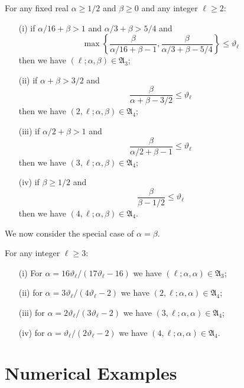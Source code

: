 \documentclass[12pt]{amsart}
\begin{document}
\begin{theorem}\label{thm:pPkPl}
For any fixed real  $\alpha \ge 1/2$ and $\beta \ge 0$  and  any integer $\ell\ge 2$:
\begin{itemize}
\item[(i)]
if $\alpha/16+  \beta > 1$ and $\alpha/3+ \beta > 5/4$
and 
$$
  \max\left\{ 
\frac{\beta}{\alpha/16+  \beta - 1},  \frac{\beta}{\alpha/3+ \beta -5/4}\right\}  \le \vartheta_\ell 
$$
then we have 
$(\ell; \alpha,  \beta)   \in {{\mathfrak A}}_3$;

\item[(ii)] if $\alpha  +\beta > 3/2$ and
$$
 \frac{\beta}{\alpha  +\beta - 3/2}  \le \vartheta_\ell 
$$
then we have 
$(2, \ell; \alpha,  \beta)   \in {{\mathfrak A}}_4$;

\item[(iii)] if $\alpha/2  +\beta > 1$ and
$$
\frac{\beta}{\alpha/2  +\beta - 1}  \le \vartheta_\ell 
$$
then we have 
$(3, \ell; \alpha,  \beta)   \in {{\mathfrak A}}_4$;

\item[(iv)] if $\beta \ge 1/2$ and
$$
   \frac{\beta}{\beta -1/2}\le \vartheta_\ell 
$$
then we have 
$(4, \ell; \alpha,  \beta)   \in {{\mathfrak A}}_4$. 
\end{itemize}
\end{theorem}

We now consider the special case of $\alpha = \beta$. 

\begin{cor}\label{cor:pPk}
For any  integer $\ell\ge 3$:
\begin{itemize}
\item[(i)]
For $\alpha = 16\vartheta_\ell /(17\vartheta_\ell -16)$ we have $(\ell; \alpha,  \alpha)   \in {{\mathfrak A}}_3$;

\item[(ii)] 
for $\alpha = 3\vartheta_\ell /(4\vartheta_\ell -2)$ 
we have $(2, \ell; \alpha,  \alpha)   \in {{\mathfrak A}}_4$;

\item[(iii)]
for $\alpha = 2\vartheta_\ell /(3\vartheta_\ell -2)$ 
we have $(3, \ell; \alpha,  \alpha)   \in {{\mathfrak A}}_4$;

\item[(iv)] 
for $\alpha = \vartheta_\ell /(2\vartheta_\ell -2)$ 
we have $(4, \ell; \alpha,  \alpha)   \in {{\mathfrak A}}_4$. 
\end{itemize}
\end{cor}

\section{Numerical Examples}
\label{sec: num ex}
\end{document}
